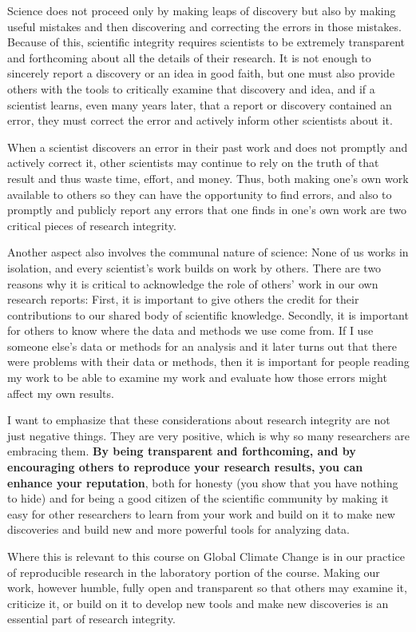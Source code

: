 \documentclass[11pt,twoside]{jgsyllabus}\usepackage[]{graphicx}\usepackage[]{color}
\begin{document}
Science does not proceed only by making leaps of discovery
but also by making useful mistakes and then discovering and correcting the
errors in those mistakes. Because of this, scientific integrity requires
scientists to be extremely transparent and forthcoming about all the details of
their research. It is not enough to sincerely report a discovery or an idea in
good faith, but one must also provide others with the tools to critically
examine that discovery and idea, and if a scientist learns, even many years
later, that a report or discovery contained an error, they must
correct the error and actively inform other scientists about it.

When a scientist discovers an error in their past work and does not promptly
and actively correct it, other scientists may continue to rely on the truth of
that result and thus waste time, effort, and money.
Thus, both making one's own work available to others so they can have the
opportunity to find errors, and also to promptly and publicly report any
errors that one finds in one's own work are two critical pieces of research
integrity.

Another aspect also involves the communal nature of science: None of us works
in isolation, and every scientist's work builds on work by others.
There are two reasons why it is critical to acknowledge the role of others' work
in our own research reports: First, it is important to give others the credit
for their contributions to our shared body of scientific knowledge. Secondly,
it is important for others to know where the data and methods we use come from.
If I use someone else's data or methods for an analysis and it later turns out
that there were problems with their data or methods, then it is important for
people reading my work to be able to examine my work and evaluate how those
errors might affect my own results.

I want to emphasize that these considerations about research integrity are not
just negative things. They are very positive, which is why so many researchers
are embracing them.
\textbf{By being transparent and forthcoming, and by encouraging
others to reproduce your research results, you can enhance your reputation},
both for honesty (you show that you have nothing to hide) and for being a
good citizen of the scientific community by making it easy for other researchers
to learn from your work and build on it to make new discoveries and build
new and more powerful tools for analyzing data.

Where this is relevant to this course on Global Climate Change is in our
practice of reproducible research in the laboratory portion of the course.
Making our work, however humble, fully open and transparent so that others
may examine it, criticize it, or build on it to develop new tools and make
new discoveries is an essential part of research integrity.
\end{document}
